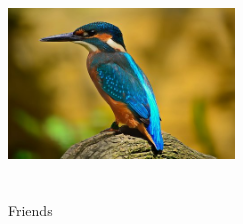 \documentclass{article}
\begin{document}
 
\begin{figure}
\centering
\includegraphics[height=6cm,width=6cm]{bird}
\caption{Friends}
\label{fig: bird}
\end{figure}
\end{document}

